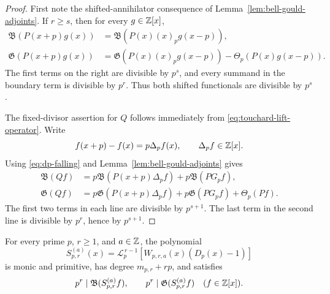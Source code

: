 \begin{proof}
First note the shifted-annihilator consequence of
Lemma~\ref{lem:bell-gould-adjoints}.  If \(r\geq s\), then for every
\(g\in\mathbb Z[x]\),
\begin{align*}
 \mathfrak B(P(x+p)g(x))
 &=\mathfrak B(P(x)(x)_pg(x-p)),\\
 \mathfrak G(P(x+p)g(x))
 &=\mathfrak G(P(x)(x)_pg(x-p))
   -\Theta_p(P(x)g(x-p)).
\end{align*}
The first terms on the right are divisible by \(p^s\), and every summand in
the boundary term is divisible by \(p^r\).  Thus both shifted functionals
are divisible by \(p^s\).

The fixed-divisor assertion for \(Q\) follows immediately from
\eqref{eq:touchard-lift-operator}.  Write
\[
 f(x+p)-f(x)=p\Delta_pf(x),
 \qquad \Delta_pf\in\mathbb Z[x].
\]
Using \eqref{eq:dp-falling} and
Lemma~\ref{lem:bell-gould-adjoints} gives
\begin{align*}
 \mathfrak B(Qf)
 &=p\mathfrak B(P(x+p)\Delta_pf)
   +p\mathfrak B(PG_pf),\\
 \mathfrak G(Qf)
 &=p\mathfrak G(P(x+p)\Delta_pf)
   +p\mathfrak G(PG_pf)+\Theta_p(Pf).
\end{align*}
The first two terms in each line are divisible by \(p^{s+1}\).  The last
term in the second line is divisible by \(p^r\), hence by \(p^{s+1}\).
\end{proof}

\begin{theorem}
\label{thm:bell-gould-prime-power}
For every prime \(p\), \(r\geq1\), and \(a\in\mathbb Z\), the polynomial
\begin{equation}\label{eq:prime-power-annihilator}
 S_{p,r}^{(a)}(x)=
 \mathcal L_p^{\,r-1}
 \left[W_{p,r,a}(x)(D_p(x)-1)\right]
\end{equation}
is monic and primitive, has degree \(m_{p,r}+rp\), and satisfies
\begin{equation}\label{eq:prime-power-universal}
 p^r\mid\mathfrak B(S_{p,r}^{(a)}f),
 \qquad
 p^r\mid\mathfrak G(S_{p,r}^{(a)}f)
 \quad(f\in\mathbb Z[x]).
\end{equation}
\end{theorem}

